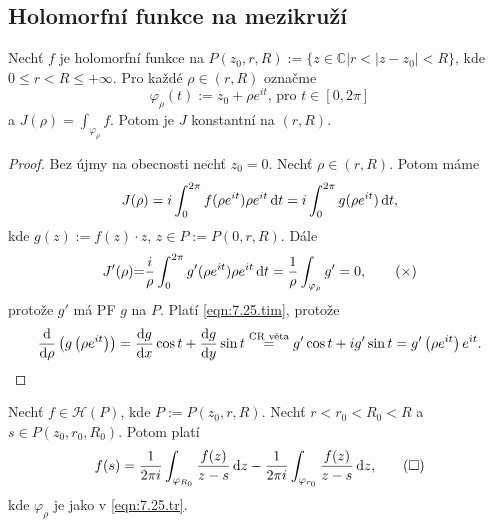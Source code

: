 
\subsection{Holomorfní funkce na mezikruží}
\begin{lemma}
Nechť $f$ je holomorfní funkce na $P(z_0,r,R):=\{z \in \mathbb{C}| r<|z-z_0|<R \}$, kde $0\leq r < R \leq + \infty$. Pro každé $\rho \in (r,R)$ označme
\begin{equation}
     \varphi_\rho(t):=z_0+\rho e^{it} \text{, pro } t\in [0,2 \pi]
     \tag{$\triangle$}
     \label{eqn:7.25.tr}
\end{equation} 
a $J(\rho)=\int_{\varphi_\rho}f$. Potom je $J$ konstantní na $(r,R)$.
\end{lemma}

\begin{proof}
Bez újmy na obecnosti nechť $z_0=0$. Nechť $\rho \in (r,R)$. Potom máme 
$$J(\rho)=i\int_0^{2\pi}f(\rho e^{it})\rho e^{it} \mathop{}\!\mathrm{d} t= \\ i\int_0^{2\pi}g(\rho e^{it})\mathop{}\!\mathrm{d} t,$$ 
kde $g(z):=f(z)\cdot z$, $z \in P:=P(0,r,R)$. Dále 
\begin{equation}
    J'(\rho){=} \frac{i}{\rho}\int_0^{2\pi}g'(\rho e^{it})\rho e^{it} \mathop{}\!\mathrm{d} t=\frac{1}{\rho}\int_{\varphi_\rho}g'=0, 
    \tag{$\times$}
    \label{eqn:7.25.tim}
\end{equation}
protože $g'$ má PF $g$ na $P$. Platí \cref{eqn:7.25.tim}, protože 
$$\frac{\mathop{}\!\mathrm{d}}{\mathop{}\!\mathrm{d} \rho}\left(g\left(\rho e^{it}\right)\right)=\frac{\mathop{}\!\mathrm{d} g}{\mathop{}\!\mathrm{d} x} \cos t+ \frac{\mathop{}\!\mathrm{d} g}{\mathop{}\!\mathrm{d} y} \sin t\stackrel{\text{CR věta}}{=}g' \cos t+ i g' \sin t=g'\left(\rho e^{it}\right)e^{it}.$$
\end{proof}

\begin{theorem}
Nechť $f \in \mathcal{H}(P)$, kde $P:=P(z_0,r,R)$. Nechť $r<r_0<R_0<R$ a $s \in P(z_0,r_0,R_0)$. Potom platí
\begin{equation}
    f(s)=\frac{1}{2 \pi i}\int_{\varphi_{R_0}}\frac{f(z)}{z-s} \mathop{}\!\mathrm{d} z - \frac{1}{2 \pi i}\int_{\varphi_{r_0}}\frac{f(z)}{z-s} \mathop{}\!\mathrm{d} z\text{,}
    \tag{$\square$}
    \label{eqn:7.26.sq}
\end{equation}
kde $\varphi_\rho$ je jako v \cref{eqn:7.25.tr}.
\end{theorem}

